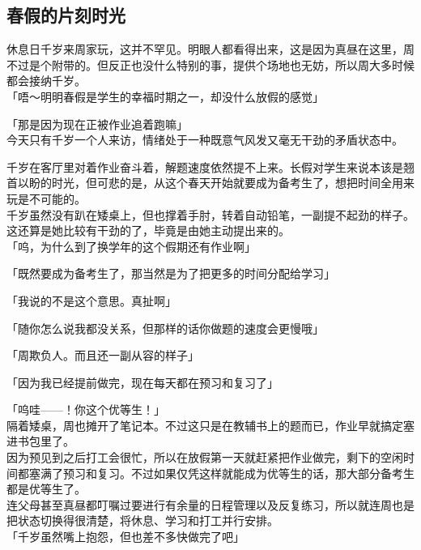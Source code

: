 \subsection{春假的片刻时光}

休息日千岁来周家玩，这并不罕见。明眼人都看得出来，这是因为真昼在这里，周不过是个附带的。但反正也没什么特别的事，提供个场地也无妨，所以周大多时候都会接纳千岁。\\

「唔～明明春假是学生的幸福时期之一，却没什么放假的感觉」

「那是因为现在正被作业追着跑嘛」\\

今天只有千岁一个人来访，情绪处于一种既意气风发又毫无干劲的矛盾状态中。

千岁在客厅里对着作业奋斗着，解题速度依然提不上来。长假对学生来说本该是翘首以盼的时光，但可悲的是，从这个春天开始就要成为备考生了，想把时间全用来玩是不可能的。\\

千岁虽然没有趴在矮桌上，但也撑着手肘，转着自动铅笔，一副提不起劲的样子。这还算是她比较有干劲的了，毕竟是由她主动提出来的。\\

「呜，为什么到了换学年的这个假期还有作业啊」

「既然要成为备考生了，那当然是为了把更多的时间分配给学习」

「我说的不是这个意思。真扯啊」

「随你怎么说我都没关系，但那样的话你做题的速度会更慢哦」

「周欺负人。而且还一副从容的样子」

「因为我已经提前做完，现在每天都在预习和复习了」

「呜哇——！你这个优等生！」\\

隔着矮桌，周也摊开了笔记本。不过这只是在教辅书上的题而已，作业早就搞定塞进书包里了。\\

因为预见到之后打工会很忙，所以在放假第一天就赶紧把作业做完，剩下的空闲时间都塞满了预习和复习。不过如果仅凭这样就能成为优等生的话，那大部分备考生都是优等生了。\\

连父母甚至真昼都叮嘱过要进行有余量的日程管理以及反复练习，所以就连周也是把状态切换得很清楚，将休息、学习和打工并行安排。\\

「千岁虽然嘴上抱怨，但也差不多快做完了吧」\\

